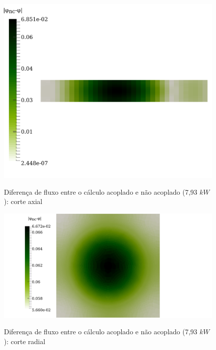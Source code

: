\begin{figure}[htb]
  \caption{Diferença de fluxo entre o cálculo acoplado e não acoplado (7,93 $kW$): corte axial}
  \centering\includegraphics[scale=0.7]{figuras/diff-flux-axial.png}
  \label{fig:f1}
\end{figure}

\begin{figure}[htb]
  \caption{Diferença de fluxo entre o cálculo acoplado e não acoplado (7,93 $kW$): corte radial}
  \centering\includegraphics[scale=0.6]{figuras/diff-flux-radial.png}
  \label{fig:f2}
\end{figure}

